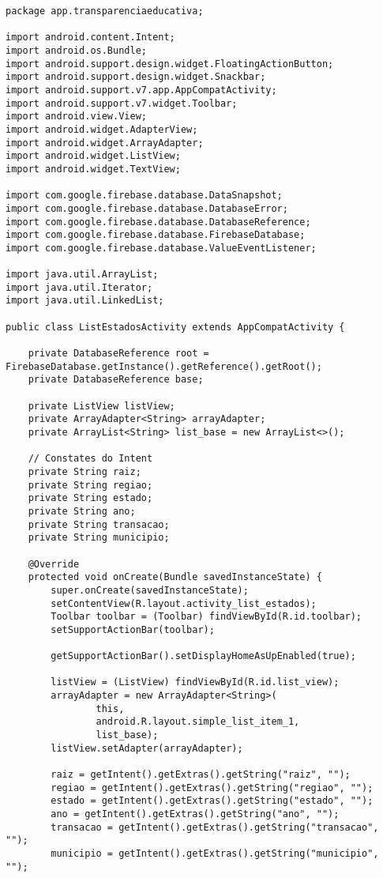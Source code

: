 \documentclass[12pt,a4paper]{article}
\begin{document}
\begin{lstlisting}[caption=./mobile/src/main/java/app/transparenciaeducativa/ListEstadosActivity.java]
package app.transparenciaeducativa;

import android.content.Intent;
import android.os.Bundle;
import android.support.design.widget.FloatingActionButton;
import android.support.design.widget.Snackbar;
import android.support.v7.app.AppCompatActivity;
import android.support.v7.widget.Toolbar;
import android.view.View;
import android.widget.AdapterView;
import android.widget.ArrayAdapter;
import android.widget.ListView;
import android.widget.TextView;

import com.google.firebase.database.DataSnapshot;
import com.google.firebase.database.DatabaseError;
import com.google.firebase.database.DatabaseReference;
import com.google.firebase.database.FirebaseDatabase;
import com.google.firebase.database.ValueEventListener;

import java.util.ArrayList;
import java.util.Iterator;
import java.util.LinkedList;

public class ListEstadosActivity extends AppCompatActivity {

    private DatabaseReference root = FirebaseDatabase.getInstance().getReference().getRoot();
    private DatabaseReference base;

    private ListView listView;
    private ArrayAdapter<String> arrayAdapter;
    private ArrayList<String> list_base = new ArrayList<>();

    // Constates do Intent
    private String raiz;
    private String regiao;
    private String estado;
    private String ano;
    private String transacao;
    private String municipio;

    @Override
    protected void onCreate(Bundle savedInstanceState) {
        super.onCreate(savedInstanceState);
        setContentView(R.layout.activity_list_estados);
        Toolbar toolbar = (Toolbar) findViewById(R.id.toolbar);
        setSupportActionBar(toolbar);

        getSupportActionBar().setDisplayHomeAsUpEnabled(true);

        listView = (ListView) findViewById(R.id.list_view);
        arrayAdapter = new ArrayAdapter<String>(
                this,
                android.R.layout.simple_list_item_1,
                list_base);
        listView.setAdapter(arrayAdapter);

        raiz = getIntent().getExtras().getString("raiz", "");
        regiao = getIntent().getExtras().getString("regiao", "");
        estado = getIntent().getExtras().getString("estado", "");
        ano = getIntent().getExtras().getString("ano", "");
        transacao = getIntent().getExtras().getString("transacao", "");
        municipio = getIntent().getExtras().getString("municipio", "");


\end{lstlisting}
\end{document}
